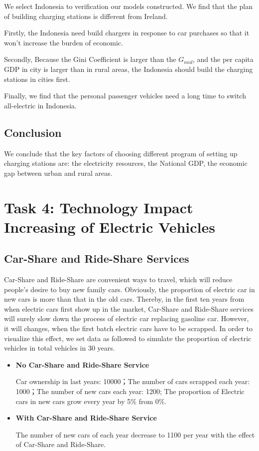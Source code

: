 \documentclass{mcmthesis}
\begin{document}
\par We select Indonesia to verification our models constructed. We find that the plan of building charging stations is different from Ireland. 
\par Firstly, the Indonesia need build chargers in response to car purchases so that it won’t increase the burden of economic.
\par Secondly, Because the Gini Coefficient is larger than the $G_{mid}$, and the per capita GDP in city is larger than in rural areas, the Indonesia should build the charging stations in cities first.
\par Finally, we find that the personal passenger vehicles need a long time to switch all-electric in Indonesia.

\subsection{Conclusion}

\par We conclude that the key factors of choosing different program of setting up charging stations are: the electricity resources, the National GDP, the economic gap between urban and rural areas.

\section{Task 4: Technology Impact Increasing of Electric Vehicles}
\subsection*{Car-Share and Ride-Share Services}
Car-Share and Ride-Share are convenient ways to travel, which will reduce people's desire to buy new family cars. Obviously, the proportion of electric car in new cars is more than that in the old cars. Thereby, in the first ten years from when electric cars first show up in the market, Car-Share and Ride-Share services will surely slow down the process of electric car replacing gasoline car. However, it will changes, when the first batch electric cars have to be scrapped. In order to visualize this effect, we set data as followed to simulate the proportion of electric vehicles in total vehicles in 30 years.

\begin{itemize}
	\item \textbf{No Car-Share and Ride-Share Service}
		\par Car ownership in last years: 10000；The number of cars scrapped each year: 1000；The number of new cars each year: 1200; The proportion of Electric cars in new cars grow every year by 5\% from 0\%. 
	\item \textbf{With Car-Share and Ride-Share Service}
		\par The number of new cars of each year decrease to 1100 per year with the effect of Car-Share and Ride-Share.
	
\end{itemize}
\end{document}
